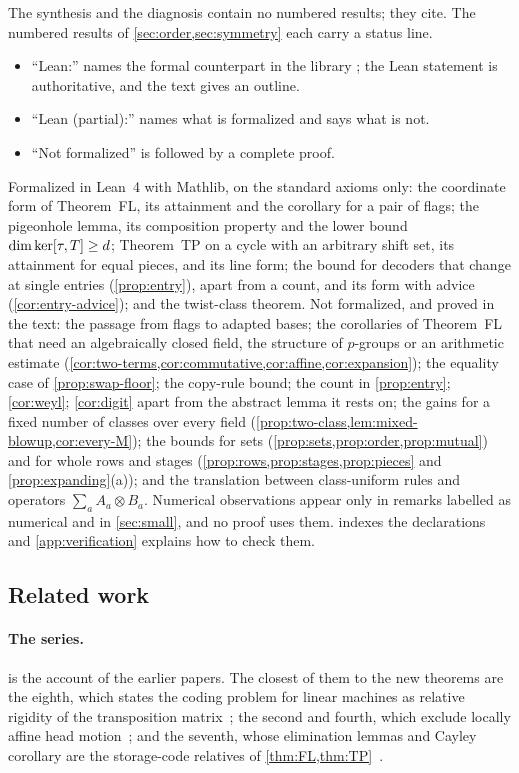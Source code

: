 The synthesis and the diagnosis contain no numbered results; they cite. The numbered results of
\cref{sec:order,sec:symmetry} each carry a status line.
\begin{itemize}[leftmargin=1.5em]
\item ``Lean:'' names the formal counterpart in the library ; the Lean statement is
authoritative, and the text gives an outline.
\item ``Lean (partial):'' names what is formalized and says what is not.
\item ``Not formalized'' is followed by a complete proof.
\end{itemize}
Formalized in Lean~4 with Mathlib, on the standard axioms only: the coordinate form of Theorem~FL, its attainment and
the corollary for a pair of flags; the pigeonhole lemma, its composition property and the lower bound
$\dim\ker[\tau,T]\ge d$; Theorem~TP on a cycle with an arbitrary shift set, its attainment for equal pieces, and its
line form; the bound for decoders that change at single entries (\cref{prop:entry}), apart from a count, and its form
with advice (\cref{cor:entry-advice}); and the twist-class theorem. Not formalized, and proved in the text: the passage from flags to adapted bases; the corollaries
of Theorem~FL that need an algebraically closed field, the structure of $p$-groups or an arithmetic estimate
(\cref{cor:two-terms,cor:commutative,cor:affine,cor:expansion}); the equality case of \cref{prop:swap-floor}; the
copy-rule bound; the count in \cref{prop:entry}; \cref{cor:weyl}; \cref{cor:digit} apart from the abstract lemma it
rests on; the gains for a fixed number of classes over every field
(\cref{prop:two-class,lem:mixed-blowup,cor:every-M}); the bounds for sets
(\cref{prop:sets,prop:order,prop:mutual}) and for whole rows and stages
(\cref{prop:rows,prop:stages,prop:pieces} and \cref{prop:expanding}(a)); and the translation between class-uniform rules and operators $\sum_aA_a\otimes B_a$. Numerical observations appear only in remarks
labelled as numerical and in \cref{sec:small}, and no proof uses them.  indexes the declarations and
\cref{app:verification} explains how to check them.

\subsection{Related work}

\paragraph{The series.}  is the account of the earlier papers. The closest of them to the new theorems
are the eighth, which states the coding problem for linear machines as relative rigidity of the transposition
matrix~\cite{EighthPaper2026}; the second and fourth, which exclude locally affine head
motion~\cite{SecondPaper2026,FourthPaper2026}; and the seventh, whose elimination lemmas and Cayley corollary are the
storage-code relatives of \cref{thm:FL,thm:TP}~\cite{SeventhPaper2026}.

